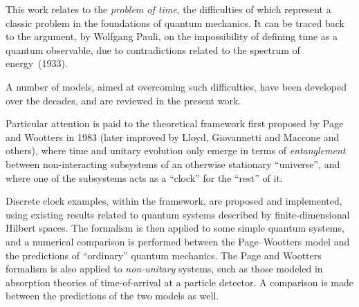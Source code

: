 This work relates to the
\emph{problem of time},
the difficulties of which
represent a classic problem in the foundations of quantum mechanics.
It can be traced back to
the argument, by Wolfgang Pauli,
on the impossibility of defining time as a quantum observable,
due to contradictions related to the spectrum of energy~(1933).

A number of models, aimed at overcoming such difficulties,
have been developed over the decades,
and are reviewed in the present work.

Particular attention is paid to 
the theoretical framework first proposed by Page and Wootters in 1983
(later improved by Lloyd, Giovannetti and Maccone and others),
where time and unitary evolution only emerge in
terms of \emph{entanglement} between non-interacting subsystems
of an otherwise stationary ``universe'',
and where one of the subsystems acts as a ``clock'' for the ``rest'' of it.

{Discrete} clock examples, within the framework, are proposed and implemented,
using
existing results related to quantum systems described by finite-dimensional Hilbert spaces.
The formalism is then applied to some simple quantum systems,
and a numerical comparison is performed between the Page--Wootters model and the predictions
of ``ordinary'' quantum mechanics.
The Page and Wootters formalism is also applied to \emph{non-unitary} systems,
such as those modeled in absorption theories of time-of-arrival at a particle detector.
A comparison is made between the predictions of the two models as well.
